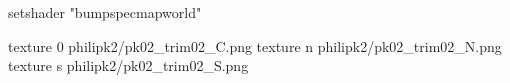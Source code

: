 setshader "bumpspecmapworld"

texture 0 philipk2/pk02_trim02_C.png
texture n philipk2/pk02_trim02_N.png
texture s philipk2/pk02_trim02_S.png

